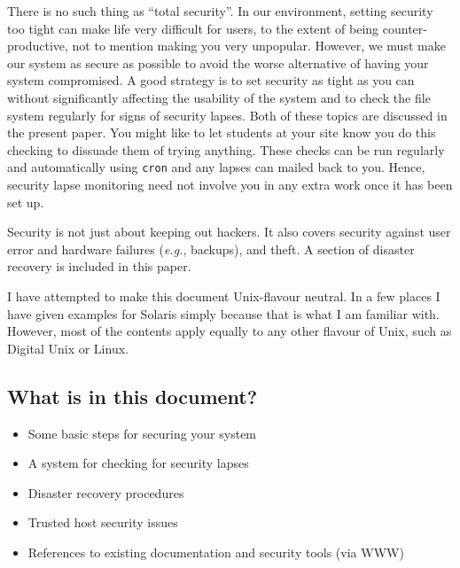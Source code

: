 There is no such thing as ``total security''. In our environment,
setting security too tight can make life very difficult for users, to
the extent of being counter-productive, not to mention making you very
unpopular. However, we must make our system as secure as possible to
avoid the worse alternative of having your system compromised.  A good
strategy is to set security as tight as you can without significantly
affecting the usability of the system and to check the file system
regularly for signs of security lapses. Both of these topics are
discussed in the present paper. You might like to let students at your
site know you do this checking to dissuade them of trying anything.
These checks can be run regularly and automatically using {\tt cron}
and any lapses can mailed back to you. Hence, security lapse monitoring
need not involve you in any extra work once it has been set up.

Security is not just about keeping out hackers. It also covers security
against user error and hardware failures (\emph{e.g.}, backups), and theft.
A section of disaster recovery is included in this paper.

I have attempted to make this document Unix-flavour neutral. In a few
places I have given examples for Solaris simply because that is what I
am familiar with. However, most of the contents apply equally to any
other flavour of Unix, such as Digital Unix or Linux.


\subsection{What is in this document?}

\begin{itemize}
\item Some basic steps for securing your system
\item A system for checking for security lapses
\item Disaster recovery procedures
\item Trusted host security issues
\item References to existing documentation and security tools (via WWW)
\end{itemize}

